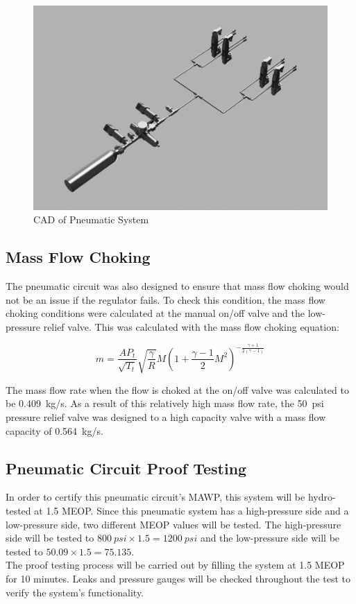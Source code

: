 \documentclass[main.tex]{subfiles}
\begin{document}
	\begin{figure}
        \centering
        \includegraphics[width=\linewidth] {images/pcircuit}
        \caption{CAD of Pneumatic System}
        \label{fig:pneumatic-cad}
    \end{figure}

  \subsection{Mass Flow Choking}
The pneumatic circuit was also designed to ensure that mass flow choking would not be an issue if the regulator fails. To check this condition, the mass flow choking conditions were calculated at the manual on/off valve and the low-pressure relief valve. This was calculated with the mass flow choking equation:\\
\begin{center}
        \[
        {m} = \frac{AP_t}{\sqrt{T_t}} \sqrt{\frac{\gamma}{R}}M(1+\frac{\gamma-1}{2}{M^2})^{-\frac{\gamma+1}{2(\gamma-1)}}
        \]
	\end{center}

The mass flow rate when the flow is choked at the on/off valve was calculated to be \SI{0.409}{kg/s}.
As a result of this relatively high mass flow rate, the \SI{50}{psi} pressure relief valve was designed to a high capacity valve with a mass flow capacity of \SI{0.564}{kg/s}.\\

    \subsection{Pneumatic Circuit Proof Testing}
    In order to certify this pneumatic circuit's MAWP, this system will be hydro-tested at 1.5 MEOP. Since this pneumatic system has a high-pressure side and a low-pressure side, two different MEOP values will be tested. The high-pressure side will be tested to $\SI{800}{psi}\times 1.5=\SI{1200}{psi}$ and the low-pressure side will be tested to $50.09 \times 1.5=75.135$.\\
    The proof testing process will be carried out by filling the system at 1.5 MEOP for 10 minutes. Leaks and pressure gauges will be checked throughout the test to verify the system's functionality.\\
\end{document}
